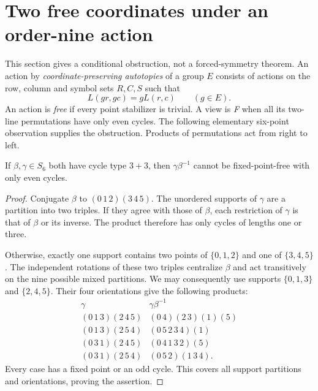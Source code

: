 \section{Two free coordinates under an order-nine action}
\label{sec:e9-free-coordinates}

This section gives a conditional obstruction, not a forced-symmetry theorem.
An action by \emph{coordinate-preserving autotopies} of a group $E$ consists
of actions on the row, column and symbol sets $R,C,S$ such that
\[
 L(gr,gc)=gL(r,c)\qquad(g\in E).
\]
An action is \emph{free} if every point stabilizer is trivial. A view is
\emph{F} when all its two-line permutations have only even cycles.
The following elementary six-point observation supplies the obstruction.
Products of permutations act from right to left.

\begin{lemma}\label{lem:e9-six-point-product}
If $\beta,\gamma\in S_6$ both have cycle type $3+3$, then
$\gamma\beta^{-1}$ cannot be fixed-point-free with only even cycles.
\end{lemma}
\begin{proof}
Conjugate $\beta$ to $(0\,1\,2)(3\,4\,5)$. The unordered supports of
$\gamma$ are a partition into two triples. If they agree with those of
$\beta$, each restriction of $\gamma$ is that of $\beta$ or its inverse.
The product therefore has only cycles of lengths one or three.

Otherwise, exactly one support contains two points of $\{0,1,2\}$ and
one of $\{3,4,5\}$. The independent rotations of these two triples
centralize $\beta$ and act transitively on the nine possible mixed
partitions. We may consequently use supports $\{0,1,3\}$ and $\{2,4,5\}$.
Their four orientations give the following products:
\[
\begin{array}{c|c}
\gamma & \gamma\beta^{-1}\\ \hline
(0\,1\,3)(2\,4\,5)&(0\,4)(2\,3)(1)(5)\\
(0\,1\,3)(2\,5\,4)&(0\,5\,2\,3\,4)(1)\\
(0\,3\,1)(2\,4\,5)&(0\,4\,1\,3\,2)(5)\\
(0\,3\,1)(2\,5\,4)&(0\,5\,2)(1\,3\,4).
\end{array}
\]
Every case has a fixed point or an odd cycle. This covers all support
partitions and orientations, proving the assertion.
\end{proof}

